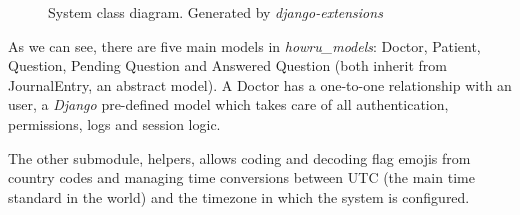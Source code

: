 \documentclass[12pt,english]{article}
\begin{document}
\begin{figure}[H]
    \caption{System class diagram. Generated by \emph{django-extensions} \protect\cite{django}}
\end{figure}

As we can see, there are five main models in \emph{howru\_models}: Doctor, Patient, Question, Pending Question and Answered Question (both inherit from JournalEntry, an abstract model). A Doctor has a one-to-one relationship with an user, a \emph{Django} pre-defined model which takes care of all authentication, permissions, logs and session logic.

The other submodule, helpers, allows coding and decoding flag emojis from country codes and managing time conversions between UTC (the main time standard in the world) and the timezone in which the system is configured.
\end{document}
